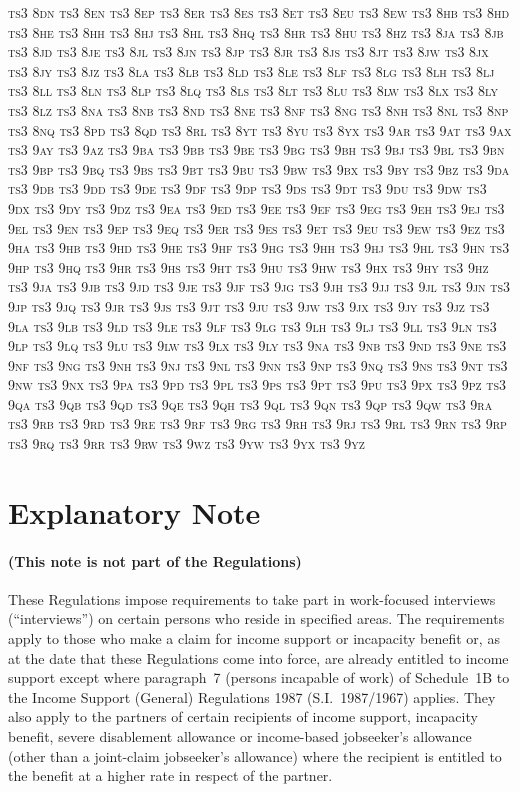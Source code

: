 \documentclass[12pt,a4paper]{article}
\begin{document}
\textsc{\lowercase{%
TS3 8DN	TS3 8EN	TS3 8EP	TS3 8ER	TS3 8ES	TS3 8ET
TS3 8EU	TS3 8EW	TS3 8HB	TS3 8HD	TS3 8HE	TS3 8HH
TS3 8HJ	TS3 8HL	TS3 8HQ	TS3 8HR	TS3 8HU	TS3 8HZ
TS3 8JA	TS3 8JB	TS3 8JD	TS3 8JE	TS3 8JL	TS3 8JN
TS3 8JP	TS3 8JR	TS3 8JS	TS3 8JT	TS3 8JW	TS3 8JX
TS3 8JY	TS3 8JZ	TS3 8LA	TS3 8LB	TS3 8LD	TS3 8LE
TS3 8LF	TS3 8LG	TS3 8LH	TS3 8LJ	TS3 8LL	TS3 8LN
TS3 8LP	TS3 8LQ	TS3 8LS	TS3 8LT	TS3 8LU	TS3 8LW
TS3 8LX	TS3 8LY	TS3 8LZ	TS3 8NA	TS3 8NB	TS3 8ND
TS3 8NE	TS3 8NF	TS3 8NG	TS3 8NH	TS3 8NL	TS3 8NP
TS3 8NQ	TS3 8PD	TS3 8QD	TS3 8RL	TS3 8YT	TS3 8YU
TS3 8YX	TS3 9AR	TS3 9AT	TS3 9AX	TS3 9AY	TS3 9AZ
TS3 9BA	TS3 9BB	TS3 9BE	TS3 9BG	TS3 9BH	TS3 9BJ
TS3 9BL	TS3 9BN	TS3 9BP	TS3 9BQ	TS3 9BS	TS3 9BT
TS3 9BU	TS3 9BW	TS3 9BX	TS3 9BY	TS3 9BZ	TS3 9DA
TS3 9DB	TS3 9DD	TS3 9DE	TS3 9DF	TS3 9DP	TS3 9DS
TS3 9DT	TS3 9DU	TS3 9DW	TS3 9DX	TS3 9DY	TS3 9DZ
TS3 9EA	TS3 9ED	TS3 9EE	TS3 9EF	TS3 9EG	TS3 9EH
TS3 9EJ	TS3 9EL	TS3 9EN	TS3 9EP	TS3 9EQ	TS3 9ER
TS3 9ES	TS3 9ET	TS3 9EU	TS3 9EW	TS3 9EZ	TS3 9HA
TS3 9HB	TS3 9HD	TS3 9HE	TS3 9HF	TS3 9HG	TS3 9HH
TS3 9HJ	TS3 9HL	TS3 9HN	TS3 9HP	TS3 9HQ	TS3 9HR
TS3 9HS	TS3 9HT	TS3 9HU	TS3 9HW	TS3 9HX	TS3 9HY
TS3 9HZ	TS3 9JA	TS3 9JB	TS3 9JD	TS3 9JE	TS3 9JF
TS3 9JG	TS3 9JH	TS3 9JJ	TS3 9JL	TS3 9JN	TS3 9JP
TS3 9JQ	TS3 9JR	TS3 9JS	TS3 9JT	TS3 9JU	TS3 9JW
TS3 9JX	TS3 9JY	TS3 9JZ	TS3 9LA	TS3 9LB	TS3 9LD
TS3 9LE	TS3 9LF	TS3 9LG	TS3 9LH	TS3 9LJ	TS3 9LL
TS3 9LN	TS3 9LP	TS3 9LQ	TS3 9LU	TS3 9LW	TS3 9LX
TS3 9LY	TS3 9NA	TS3 9NB	TS3 9ND	TS3 9NE	TS3 9NF
TS3 9NG	TS3 9NH	TS3 9NJ	TS3 9NL	TS3 9NN	TS3 9NP
TS3 9NQ	TS3 9NS	TS3 9NT	TS3 9NW	TS3 9NX	TS3 9PA
TS3 9PD	TS3 9PL	TS3 9PS	TS3 9PT	TS3 9PU	TS3 9PX
TS3 9PZ	TS3 9QA	TS3 9QB	TS3 9QD	TS3 9QE	TS3 9QH
TS3 9QL	TS3 9QN	TS3 9QP	TS3 9QW	TS3 9RA	TS3 9RB
TS3 9RD	TS3 9RE	TS3 9RF	TS3 9RG	TS3 9RH	TS3 9RJ
TS3 9RL	TS3 9RN	TS3 9RP	TS3 9RQ	TS3 9RR	TS3 9RW
TS3 9WZ	TS3 9YW	TS3 9YX	TS3 9YZ
}}

\part{Explanatory Note}

\renewcommand\parthead{— Explanatory Note}

\subsection*{(This note is not part of the Regulations)}

These Regulations impose requirements to take part in work-focused interviews (“interviews”) on certain persons who reside in specified areas. The requirements apply to those who make a claim for income support or incapacity benefit or, as at the date that these Regulations come into force, are already entitled to income support except where paragraph~7 (persons incapable of work) of Schedule~1B to the Income Support (General) Regulations 1987 (S.I.~1987/1967) applies. They also apply to the partners of certain recipients of income support, incapacity benefit, severe disablement allowance or income-based jobseeker’s allowance (other than a joint-claim jobseeker’s allowance) where the recipient is entitled to the benefit at a higher rate in respect of the partner.
\end{document}
